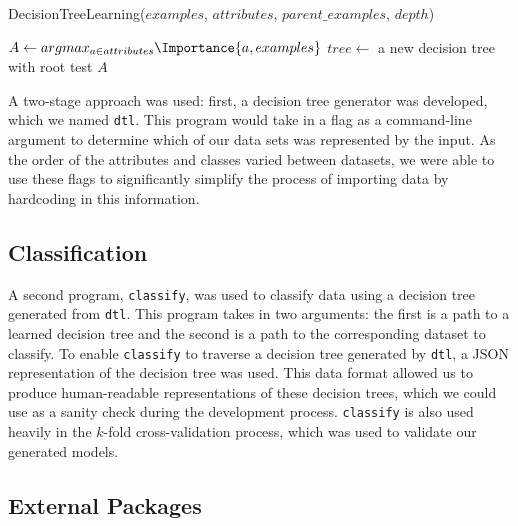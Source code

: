 \documentclass[screen, authorversion, nonacm, sigconf]{acmart}
\begin{document}
\begin{function}
	\SetAlgoLined
  \caption{DecisionTreeLearning($examples$, $attributes$, $parent\_examples$, $depth$)}
  \label{algo:DecisionTreeLearning}
  $A \gets argmax_{a \in attributes} \Importance{a, examples}$\;
  $tree \gets$ a new decision tree with root test $A$\;
  \;
\end{function}

A two-stage approach was used: first, a decision tree generator was developed, which we named \texttt{dtl}. This program would take in a flag as a command-line argument to determine which of our data sets was represented by the input. As the order of the attributes and classes varied between datasets, we were able to use these flags to significantly simplify the process of importing data by hardcoding in this information. 

\subsection{Classification}

A second program, \texttt{classify}, was used to classify data using a decision tree generated from \texttt{dtl}. This program takes in two arguments: the first is a path to a learned decision tree and the second is a path to the corresponding dataset to classify. To enable \texttt{classify} to traverse a decision tree generated by \texttt{dtl}, a JSON representation of the decision tree was used. This data format allowed us to produce human-readable representations of these decision trees, which we could use as a sanity check during the development process. \texttt{classify} is also used heavily in the $k$-fold cross-validation process, which was used to validate our generated models.

\subsection{External Packages}
\end{document}
